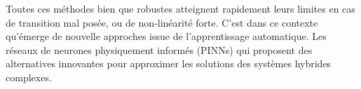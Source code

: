 \documentclass[12pt, oneside]{report} %
\theoremstyle{definition}
\theoremstyle{remark}
\begin{document}
		
		
%		
		
		
		
		Toutes ces méthodes bien que robustes atteignent rapidement leurs limites en cas de transition mal posée, ou de non-linéarité forte. C'est dans ce contexte qu'émerge de nouvelle approches issue de l'apprentissage automatique. Les réseaux de neurones physiquement informés (PINNs) qui proposent des alternatives innovantes pour approximer les solutions des systèmes hybrides complexes.\
		
\end{document}
